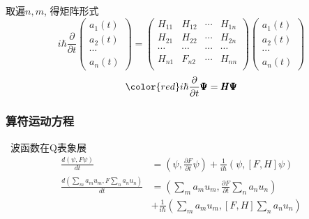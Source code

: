 \begin{frame} 
    取遍$n,m$, 得矩阵形式\\ 
    $$i\hbar \frac{\partial}{\partial t }  
    \begin{pmatrix}
        a_1(t)\\
        a_2(t)\\
        \cdots \\
        a_n(t)
    \end{pmatrix}
    =         
    \begin{pmatrix}
        H_{11} & H_{12} & \cdots & H_{1n} \\
        H_{21} & H_{22} & \cdots & H_{2n} \\
        \cdots & \cdots &  \cdots& \cdots\\
        H_{n1} & F_{n2} & \cdots & H_{nn} \\
     \end{pmatrix}
     \begin{pmatrix}
         a_1(t)\\
         a_2(t)\\
         \cdots \\
         a_n(t)
     \end{pmatrix}
    $$ \vspace{0.6em }
    $$\color{red} i\hbar \frac{\partial}{\partial t }  \pmb \Psi = \pmb H  \pmb \Psi $$
\end{frame}

\begin{frame} 
    \frametitle{算符运动方程}
    \解~波函数在Q表象展
    \begin{equation*}
        \begin{split}
            \frac{d(\psi,F \psi )}{dt} &=(\psi,\frac{\partial F }{\partial t} \psi)  +\frac{1}{i\hbar}  ( \psi,[F,H]\psi) \\
            \frac{d(\sum_m a_m u_m,F \sum_n a_n u_n )}{dt} &=(\sum_m a_m u_m,\frac{\partial F }{\partial t} \sum_n a_n u_n) \\  
            &+\frac{1}{i\hbar}  (\sum_m a_m u_m,[F,H]\sum_n a_n u_n)  \\    
        \end{split} 
    \end{equation*}
\end{frame}

